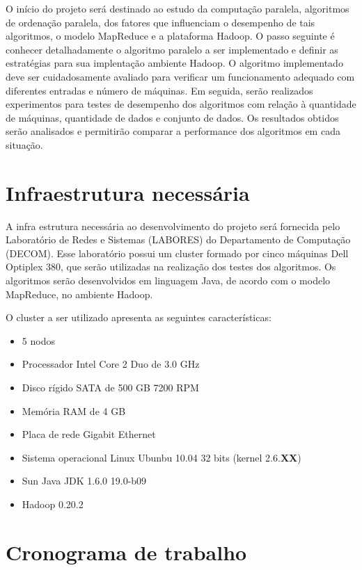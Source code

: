 O início do projeto será destinado ao estudo da computação paralela, algoritmos de ordenação paralela, dos fatores que influenciam o desempenho de tais algoritmos, o modelo MapReduce e a plataforma Hadoop. O passo seguinte é conhecer detalhadamente o algoritmo paralelo a ser implementado e definir as estratégias para sua implentação ambiente Hadoop. 
O algoritmo implementado deve ser cuidadosamente avaliado para verificar um funcionamento adequado com diferentes entradas e número de máquinas. 
Em seguida, serão realizados experimentos para testes de desempenho dos algoritmos com relação à quantidade de máquinas, quantidade de dados e conjunto de dados.  Os resultados obtidos serão analisados e permitirão comparar a performance dos algoritmos em cada situação. 


\section{Infraestrutura necessária}

A infra estrutura necessária ao desenvolvimento do projeto será fornecida pelo Laboratório de Redes e Sistemas (LABORES) do Departamento de Computação (DECOM). Esse laboratório possui um cluster formado por cinco máquinas Dell Optiplex 380, que serão utilizadas na realização dos testes dos algoritmos. Os algoritmos serão desenvolvidos em linguagem Java, de acordo com o modelo MapReduce, no ambiente Hadoop. 

O cluster a ser utilizado apresenta as seguintes características:
\begin{itemize}
\item 5 nodos
\item Processador Intel Core 2 Duo de 3.0 GHz
\item Disco rígido SATA de 500 GB 7200 RPM
\item Memória RAM de 4 GB
\item Placa de rede Gigabit Ethernet
\item Sistema operacional Linux Ubunbu 10.04 32 bits (kernel 2.6.\textbf{XX})
\item Sun Java JDK 1.6.0 19.0-b09 
\item Hadoop 0.20.2
\end{itemize}

\section{Cronograma de trabalho}

